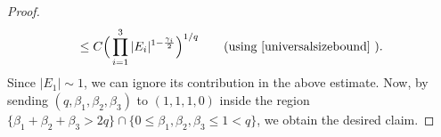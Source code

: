 \documentclass[12pt]{amsart}
\numberwithin{equation}{section}
\begin{document}
\begin{proof}
$$\le C \Big(\prod_{i=1}^3 |E_i|^{1 -\frac{\gamma_i}{2}}\Big)^{1/q} \qquad \text{(using \eqref{universalsizebound} )}.$$
Since $|E_1| \sim 1$, we can ignore its contribution in the above estimate. Now, by sending $(q,\beta_1,\beta_2,\beta_3)$ to $(1,1,1,0)$ inside the region $\{\beta_1+\beta_2+\beta_3>2q\} \cap \{0\le \beta_1,\beta_2,\beta_3\le 1<q\}$, we obtain the desired claim.
\end{proof}






\end{document}
